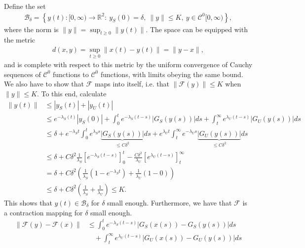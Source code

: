 \begin{enumerate}
Define the set
\begin{align}
	\mathcal{B}_{\delta} = \left\{ y(t): [0,\infty ) \to \mathbb{R}^{2}:\ y_{S}(0) = \delta,\ \|y\| \leq K,\ y\in \mathcal{C}^{0}[0, \infty ) \right\},
\end{align}
where the norm is $\|y\| = \sup_{t\geq 0}\|y(t)\|$. The space can be equipped with the metric 
\begin{align}
	d(x,y) = \sup_{t\geq 0} \| x(t) - y(t) \| = \| y - x\|,
\end{align}
and is complete with respect to this metric by the uniform convergence of Cauchy sequences of $\mathcal{C}^{0}$ functions to $\mathcal{C}^{0}$ functions, with limits obeying the same bound. We also have to show that $\mathcal{F}$ maps into itself, i.e. that $ \|\mathcal{F}(y) \| \leq K$ when $\|y\| \leq K$. To this end, calculate
\begin{subequations}
\begin{align}
	\|y(t)\| &\leq | y_{S}(t)| + |y_{U}(t) | \\
		 &\leq e^{-\lambda _{S}(t)}| y_{S}(0)| + \int_{0}^{t} e^{-\lambda _{S}(t-s)}{| G_{S}(y(s))|} ds + \int_{t}^{\infty } e^{\lambda _{U}(t-s)}{|G_{U}(y(s))|}ds \\
		 &\leq \delta + e^{-\lambda _{S}t}\int_{0}^{t} e^{\lambda _{S}s}\underbrace{| G_{S}(y(s))|}_{\leq C\delta^{2}} ds + e^{\lambda _{U}t}\int_{t}^{\infty } e^{-\lambda _{U}s}\underbrace{|G_{U}(y(s))|}_{\leq C\delta ^{2}}ds \\
		 &\leq \delta + C\delta^{2} \frac{1}{\lambda_{S}} \left[ e^{-\lambda _{S}(t-s)}\right]_{0}^{t} - \frac{C \delta^2}{\lambda _{U}} \left[ e^{\lambda _{U}(t-s)}\right]_{t}^{\infty } \\
		 &= \delta + C \delta^{2} \left( \frac{1}{\lambda_{S}}\left(1 - e^{-\lambda _{S}t}\right) + \frac{1}{\lambda _{U}}\left(1-0\right) \right) \\
		 &\leq \delta + C \delta^{2} \left( \frac{1}{\lambda _S} + \frac{1}{\lambda _U}\right) \leq K.
\end{align}
\end{subequations}
This shows that $y(t) \in \mathcal{B}_{\delta}$ for $\delta$ small enough. Furthermore, we have that $\mathcal{F}$ is a contraction mapping for $\delta$ small enough.
\begin{align}
	\|\mathcal{F}(y) - \mathcal{F}(x)\| &\leq \int_{0}^{t} e^{-\lambda_{S}(t-s)}| G_{S}(x(s)) - G_{S}(y(s))| ds \\
					    &\quad + \int_{t}^{\infty } e^{\lambda _{U}(t-s)} | G_{U}(x(s)) - G_{U}(y(s)) | ds \\

\end{align}
\end{enumerate}
